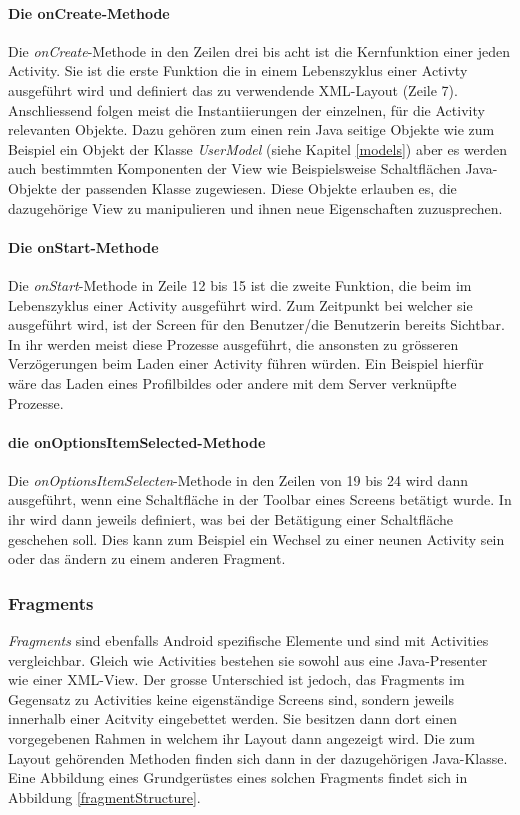 \documentclass[../main.tex]{subfiles}
\begin{document}
	\paragraph{Die onCreate-Methode}
	Die \emph{onCreate}-Methode in den Zeilen drei bis acht ist die Kernfunktion einer jeden Activity. Sie ist die erste Funktion die in einem Lebenszyklus einer Activty ausgeführt wird und definiert das zu verwendende XML-Layout (Zeile 7). Anschliessend folgen meist die Instantiierungen der einzelnen, für die Activity relevanten Objekte. Dazu gehören zum einen rein Java seitige Objekte wie zum Beispiel ein Objekt der Klasse \emph{UserModel} (siehe Kapitel \ref{models}) aber es werden auch bestimmten Komponenten der View wie Beispielsweise Schaltflächen Java-Objekte der passenden Klasse zugewiesen. Diese Objekte erlauben es, die dazugehörige View zu manipulieren und ihnen neue Eigenschaften zuzusprechen.

	\paragraph{Die onStart-Methode}
	Die \emph{onStart}-Methode in Zeile 12 bis 15 ist die zweite Funktion, die beim im Lebenszyklus einer Activity ausgeführt wird. Zum Zeitpunkt bei welcher sie ausgeführt wird, ist der Screen für den Benutzer/die Benutzerin bereits Sichtbar. In ihr werden meist diese Prozesse ausgeführt, die ansonsten zu grösseren Verzögerungen beim Laden einer Activity führen würden. Ein Beispiel hierfür wäre das Laden eines Profilbildes oder andere mit dem Server verknüpfte Prozesse.
	
	\paragraph{die onOptionsItemSelected-Methode}
	Die \emph{onOptionsItemSelecten}-Methode in den Zeilen von 19 bis 24 wird dann ausgeführt, wenn eine Schaltfläche in der Toolbar eines Screens betätigt wurde. In ihr wird dann jeweils definiert, was bei der Betätigung einer Schaltfläche geschehen soll. Dies kann zum Beispiel ein Wechsel zu einer neunen Activity sein oder das ändern zu einem anderen Fragment.
	
	\subsubsection{Fragments}
	\emph{Fragments} sind ebenfalls Android spezifische Elemente und sind mit Activities vergleichbar. Gleich wie Activities bestehen sie sowohl aus eine Java-Presenter wie einer XML-View. Der grosse Unterschied ist jedoch, das Fragments im Gegensatz zu Activities keine eigenständige Screens sind, sondern jeweils innerhalb einer Acitvity eingebettet werden. Sie besitzen dann dort einen vorgegebenen Rahmen in welchem ihr Layout dann angezeigt wird. Die zum Layout gehörenden Methoden finden sich dann in der dazugehörigen Java-Klasse. Eine Abbildung eines Grundgerüstes eines solchen Fragments findet sich in Abbildung \ref{fragmentStructure}.
	
\end{document}
